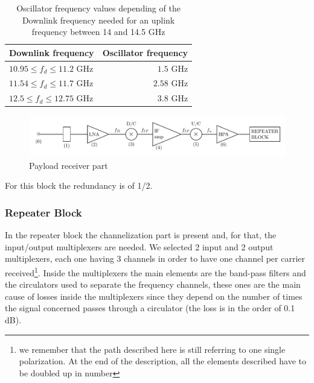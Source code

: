 \documentclass[11pt,a4paper,titlepage]{article}
\begin{document}
			\begin{table}
			\centering
			\begin{tabular}{lr}
			\toprule
			Downlink frequency & Oscillator frequency\\
			\midrule
			$10.95 \leq f_d \leq 11.2$ GHz & $1.5$ GHz\\
			$11.54 \leq f_d \leq 11.7$ GHz & $2.58$ GHz\\
			$12.5 \leq f_d \leq 12.75$ GHz & $3.8$ GHz\\
			\bottomrule
			\end{tabular}
			\caption{Oscillator frequency values depending of the Downlink frequency needed for an uplink frequency between 14 and 14.5 GHz}
			\label{tab:oscillator}
		\end{table}
		\begin{figure}[h]
			\centering
			\includegraphics[width = \textwidth]{payload_receiver.pdf}
			\caption{Payload receiver part}
			\label{fig:receiver}
		\end{figure}
For this block the redundancy is of 1/2.

		\subsubsection{Repeater Block}
			In the repeater block the channelization part is present and, for that, the input/output multiplexers are needed. We selected 2 input and 2 output multiplexers, each one having 3 channels in order to have one channel per carrier received\footnote{we remember that the path described here is still referring to one single polarization. At the end of the description, all the elements described have to be doubled up in number}. Inside the multiplexers the main elements are the band-pass filters and the circulators used to separate the frequency channels, these ones are the main cause of losses inside the multiplexers since they depend on the number of times the signal concerned passes through a circulator (the loss is in the order of 0.1 dB).
\end{document}
